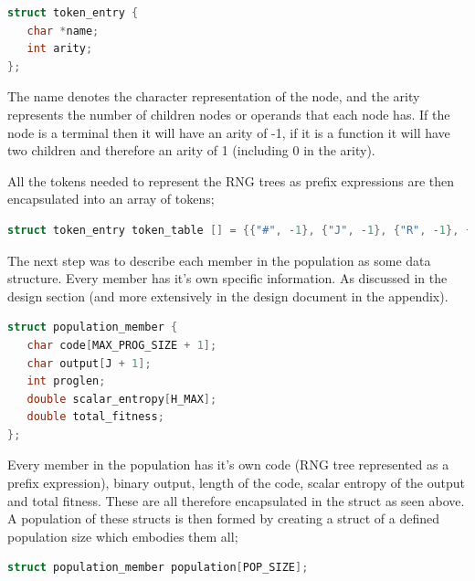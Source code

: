 \documentclass[a4paper,10.5pt]{article}
\begin{document}
\begin{lstlisting}[language=C]
struct token_entry {
   char *name;
   int arity;
};
\end{lstlisting}

The name denotes the character representation of the node, and the arity represents the number of children nodes or operands that each node has. If the node is a terminal then it will have an arity of -1, if it is a function it will have two children and therefore an arity of 1 (including 0 in the arity).

All the tokens needed to represent the RNG trees as prefix expressions are then encapsulated into an array of tokens;
\begin{lstlisting}[language=C]
struct token_entry token_table [] = {{"#", -1}, {"J", -1}, {"R", -1}, {"+", 1}, {"-", 1}, {"*", 1}, {"%", 1}, {"/", 1}, {"0", -1}, {"1", -1}, {"2", -1}, {"3", -1} };
\end{lstlisting}

The next step was to describe each member in the population as some data structure. Every member has it's own specific information. As discussed in the design section (and more extensively in the design document in the appendix).

\begin{lstlisting}[language=C]
struct population_member {
   char code[MAX_PROG_SIZE + 1];
   char output[J + 1];
   int proglen;
   double scalar_entropy[H_MAX];
   double total_fitness;
};
\end{lstlisting}

Every member in the population has it's own code (RNG tree represented as a prefix expression), binary output, length of the code, scalar entropy of the output and total fitness. These are all therefore encapsulated in the struct as seen above. A population of these structs is then formed by creating a struct of a defined population size which embodies them all;

\begin{lstlisting}[language=C]
struct population_member population[POP_SIZE];
\end{lstlisting}
\end{document}
